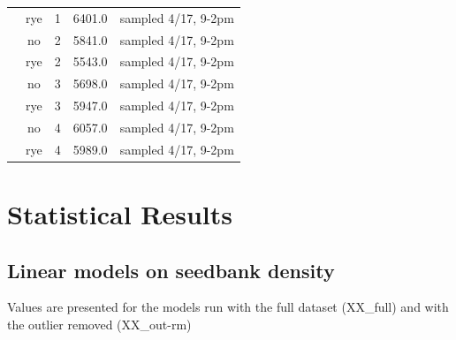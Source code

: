 \documentclass[]{article}
\begin{document}
\begin{table}[H]
\begin{tabular}[t]{ccccc}
\rowcolor{gray!6}   & rye & 1 & 6401.0 & sampled 4/17, 9-2pm\\

 & no & 2 & 5841.0 & sampled 4/17, 9-2pm\\

\rowcolor{gray!6}   & rye & 2 & 5543.0 & sampled 4/17, 9-2pm\\

 & no & 3 & 5698.0 & sampled 4/17, 9-2pm\\

\rowcolor{gray!6}   & rye & 3 & 5947.0 & sampled 4/17, 9-2pm\\

 & no & 4 & 6057.0 & sampled 4/17, 9-2pm\\

\rowcolor{gray!6}  \multirow[t]{-8}{*}{\centering\arraybackslash West} & rye & 4 & 5989.0 & sampled 4/17, 9-2pm\\
\bottomrule
\end{tabular}
\end{table}

\newpage

\hypertarget{statistical-results}{%
\section{Statistical Results}\label{statistical-results}}

\hypertarget{linear-models-on-seedbank-density}{%
\subsection{Linear models on seedbank
density}\label{linear-models-on-seedbank-density}}

Values are presented for the models run with the full dataset (XX\_full)
and with the outlier removed (XX\_out-rm)
\end{document}
